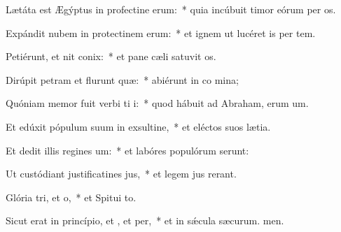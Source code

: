\item Lætáta est Ægýptus in profectine erum:~* quia incúbuit timor eórum per os.
\item Expándit nubem in protectinem erum:~* et ignem ut lucéret is per tem.
\item Petiérunt, et nit conix:~* et pane cæli satuvit os.
\item Dirúpit petram et flurunt quæ:~* abiérunt in co mina;
\item Quóniam memor fuit verbi ti i:~* quod hábuit ad Abraham, erum um.
\item Et edúxit pópulum suum in exsultine,~* et eléctos suos  lætia.
\item Et dedit illis regines um:~* et labóres populórum serunt:
\item Ut custódiant justificatines jus,~* et legem jus rerant.
\item Glória tri, et o,~* et Spitui to.
\item Sicut erat in princípio, et , et per,~* et in sǽcula sæcurum. men.
